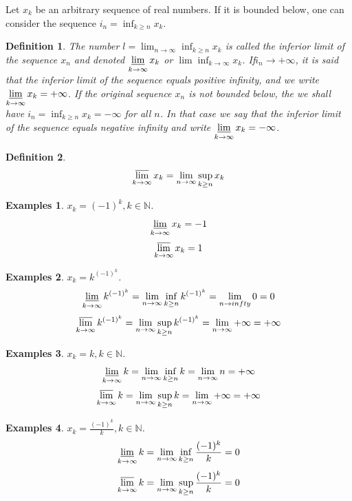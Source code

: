\documentclass[a4paper,12pt]{article} %
\newtheorem{definition}{Definition}[section]
\newtheorem{example}{Examples}
\begin{document}
Let $x_k$ be an arbitrary sequence of real numbers. If it is bounded below,
one can consider the sequence $\displaystyle i_n = \inf_{k\ge n} x_k$.
\begin{definition}
    The number $\displaystyle l = \lim_{n \to \infty} \inf_{k \ge n}x_k$
    is called the inferior limit of the sequence ${x_n}$ and denoted 
    $\displaystyle \varliminf_{k \to \infty} x_k$
    or $\displaystyle \lim \inf_{k \to \infty} x_k$. If$i_n \to +\infty$,
    it is said that the inferior limit of the sequence equals positive 
    infinity, and we write $\displaystyle \varliminf_{k \to \infty} x_k 
    = +\infty$. If the original sequence ${x_n}$ is not bounded below, the we 
    shall have $i_n = \inf_{k \ge n} x_k = -\infty$ for all $n$. In that case 
    we say that the inferior limit of the sequence equals negative 
    infinity and write $\displaystyle \varliminf_{k \to \infty} x_k
    = -\infty$.
\end{definition}

\begin{definition}
    \[\varlimsup_{k \to \infty}x_k = \lim_{n \to \infty}
    \sup_{k \ge n}x_k\]
\end{definition}

\begin{example}
    $x_k = (-1)^k, k \in \mathbb{N}$.
    \[\varliminf_{k \to \infty} x_k = -1\]
    \[\varlimsup_{k \to \infty} x_k = 1\]
\end{example}

\begin{example}
    $\displaystyle x_k = k^{(-1)^k}$.
    \[ \varliminf_{k \to \infty} k^{(-1)^k} = \lim_{n \to \infty} 
    \inf_{k \ge n} k^{(-1)^k}= \lim_{n \to infty} 0 = 0\]
    \[ \varlimsup_{k \to \infty} k^{(-1)^k} = \lim_{n \to \infty} 
    \sup_{k \ge n} k^{(-1)^k}= \lim_{n \to \infty} +\infty = +\infty\]
\end{example}

\begin{example}
    $x_k = k, k \in \mathbb{N}$.
    \[ \varliminf_{k \to \infty} k = \lim_{n \to \infty} 
    \inf_{k \ge n} k= \lim_{n \to \infty} n = +\infty\]
    \[ \varlimsup_{k \to \infty} k = \lim_{n \to \infty} 
    \sup_{k \ge n} k = \lim_{n \to \infty} +\infty = +\infty\]
\end{example}

\begin{example}
    $\displaystyle x_k = \frac{(-1)^k}{k}, k \in \mathbb{N}$.
    \[ \varliminf_{k \to \infty} k = \lim_{n \to \infty} 
    \inf_{k \ge n} \frac{(-1)^k}{k}= 0\]
    \[ \varlimsup_{k \to \infty} k = \lim_{n \to \infty} 
    \sup_{k \ge n} \frac{(-1)^k}{k} = 0\]
\end{example}
\end{document}
